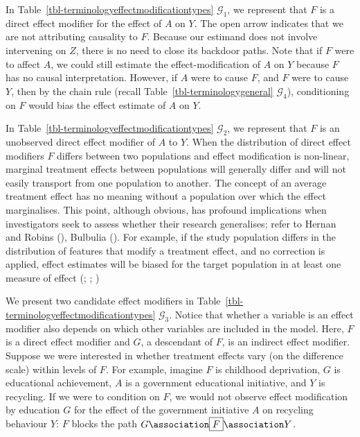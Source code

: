 \documentclass[
  single column]{article}
\begin{document}
In Table~\ref{tbl-terminologyeffectmodificationtypes} \(\mathcal{G}_1\),
we represent that \(F\) is a direct effect modifier for the effect of
\(A\) on \(Y\). The open arrow indicates that we are not attributing
causality to \(F\). Because our estimand does not involve intervening on
\(Z\), there is no need to close its backdoor paths. Note that if \(F\)
were to affect \(A\), we could still estimate the effect-modification of
\(A\) on \(Y\) because \(F\) has no causal interpretation. However, if
\(A\) were to cause \(F\), and \(F\) were to cause \(Y\), then by the
chain rule (recall Table~\ref{tbl-terminologygeneral}
\(\mathcal{G}_4\)), conditioning on \(F\) would bias the effect estimate
of \(A\) on \(Y\).

In Table~\ref{tbl-terminologyeffectmodificationtypes} \(\mathcal{G}_2\),
we represent that \(F\) is an unobserved direct effect modifier of \(A\)
to \(Y\). When the distribution of direct effect modifiers \(F\) differs
between two populations and effect modification is non-linear, marginal
treatment effects between populations will generally differ and will not
easily transport from one population to another. The concept of an
average treatment effect has no meaning without a population over which
the effect marginalises. This point, although obvious, has profound
implications when investigators seek to assess whether their research
generalises; refer to Hernan and Robins
(), Bulbulia
(). For example, if the study
population differs in the distribution of features that modify a
treatment effect, and no correction is applied, effect estimates will be
biased for the target population in at least one measure of effect
(;
;
)

We present two candidate effect modifiers in
Table~\ref{tbl-terminologyeffectmodificationtypes} \(\mathcal{G}_3\).
Notice that whether a variable is an effect modifier also depends on
which other variables are included in the model. Here, \(F\) is a direct
effect modifier and \(G\), a descendant of \(F\), is an indirect effect
modifier. Suppose we were interested in whether treatment effects vary
(on the difference scale) within levels of \(F\). For example, imagine
\(F\) is childhood deprivation, \(G\) is educational achievement, \(A\)
is a government educational initiative, and \(Y\) is recycling. If we
were to condition on \(F\), we would not observe effect modification by
education \(G\) for the effect of the government initiative \(A\) on
recycling behaviour \(Y\): \(\boxed{F}\) blocks the path
\(G \association \boxed{F} \association Y\).
\end{document}
